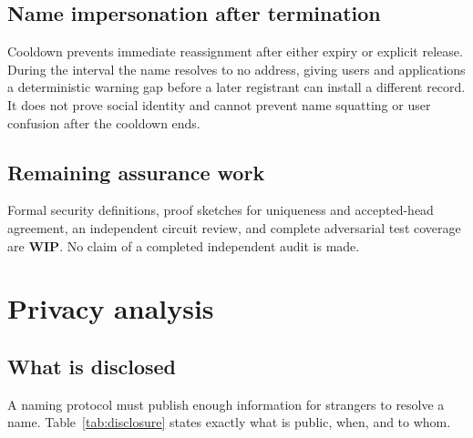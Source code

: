 \documentclass[11pt]{article}
\newcommand{\statusword}[1]{\textbf{#1}}
\begin{document}
\subsection{Name impersonation after termination}

Cooldown prevents immediate reassignment after either expiry or explicit
release. During the interval the name resolves to no address, giving users
and applications a deterministic warning gap before a later registrant can
install a different record. It does not prove social identity and cannot
prevent name squatting or user confusion after the cooldown ends.

\subsection{Remaining assurance work}

Formal security definitions, proof sketches for uniqueness and accepted-head
agreement, an independent circuit review, and complete adversarial test
coverage are \statusword{WIP}. No claim of a completed independent audit is
made.

\section{Privacy analysis}
\label{sec:privacy}

\subsection{What is disclosed}

A naming protocol must publish enough information for strangers to resolve a
name. Table~\ref{tab:disclosure} states exactly what is public, when, and to
whom.
\end{document}
